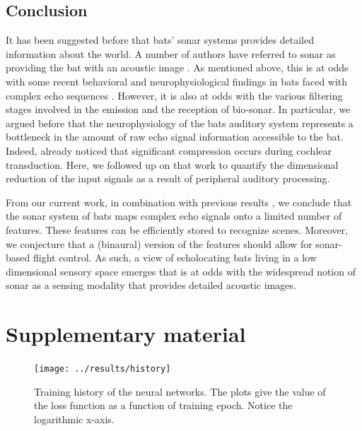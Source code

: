 \documentclass[preprint,5p]{elsarticle}
\begin{document}
\subsection{Conclusion}

It has been suggested before that bats' sonar systems provides detailed information about the world. A number of authors have referred to sonar as providing the bat with an acoustic image \citep{Lee2017,Barchi2013,Moss2001,Schnitzler2003,Simmons2012,Ulanovsky2008,Clare2015,Surlykke2016,Geipel2013}. As mentioned above, this is at odds with some recent behavioral and neurophysiological findings in bats faced with complex echo sequences \citep{Knowles2015,Geberl2013,Warnecke2018}. However, it is also at odds with the various filtering stages involved in the emission and the reception of bio-sonar. In particular, we argued before that the neurophysiology of the  bats auditory system represents a bottleneck in the amount of raw echo signal information accessible to the bat. Indeed, \citet{Reijniers2010a} already noticed that significant compression occurs during cochlear transduction. Here, we followed up on that work to quantify the dimensional reduction of the input signals as a result of peripheral auditory processing.

From our current work, in combination with previous results \citep{Vanderelst2016,Vanderelst2015a,Mansour2019,Reijniers2010a}, we conclude that the sonar system of bats maps complex echo signals onto a limited number of features. These features can be efficiently stored to recognize scenes. Moreover, we conjecture that a (binaural) version of the features should allow for sonar-based flight control. As such, a view of echolocating bats living in a low dimensional sensory space emerges that is at odds with the widespread notion of sonar as a sensing modality that provides detailed acoustic images.



\onecolumn
\appendix
\section{Supplementary material}

\begin{figure}[h]
	\centering
	\texttt{[image: ../results/history]}
	\caption{Training history of the neural networks. The plots give the value of the loss function as a function of training epoch. Notice the logarithmic x-axis.}
	\label{fig:history}
\end{figure}
\end{document}
